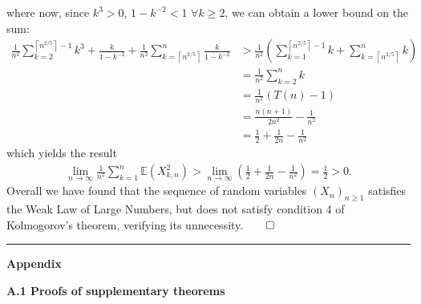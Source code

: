 \documentclass[10pt]{article}
\newcommand{\E}{\mathbb{E}}
\newcommand{\bp}[1]{\left({#1}\right)}
\newcommand{\1}[1]{\mathbbm{1}_{#1}}
\newcommand*{\ceil}[1]{\left\lceil#1\right\rceil}
\begin{document}
    where now, since $k^3>0$, $1-k^{-2}<1$ $\forall k\geq 2$, we can obtain a lower bound on the sum:
    \begin{align*}
        \frac{1}{n^2}\sum_{k=2}^{\ceil{n^{2/5}}-1}k^3+\frac{k}{1-k^{-2}}+\frac{1}{n^2}\sum_{k=\ceil{n^{2/5}}}^n\frac{k}{1-k^{-2}}
        &>\frac{1}{n^2}\bp{\sum_{k=1}^{\ceil{n^{2/5}}-1}k+\sum_{k=\ceil{n^{2/5}}}^nk}\\
        &=\frac{1}{n^2}\sum_{k=2}^nk\\
        &=\frac{1}{n^2}\bp{T(n)-1}\\
        &=\frac{n(n+1)}{2n^2}-\frac{1}{n^2}\\
        &=\frac{1}{2}+\frac{1}{2n}-\frac{1}{n^2}
    \end{align*}
    which yields the result
    \begin{align*}
        \lim_{n\rightarrow\infty}\frac{1}{n^2}\sum_{k=1}^n\E(X_{k,n}^2)>\lim_{n\rightarrow\infty}\bp{\frac{1}{2}+\frac{1}{2n}-\frac{1}{n^2}}=\frac{1}{2}>0.
    \end{align*}
    Overall we have found that the sequence of random variables $(X_n)_{n\geq 1}$ satisfies the Weak Law of Large Numbers, but does not satisfy condition 4 of Kolmogorov's theorem, verifying its unnecessity.\hfill{$\qed$}
    \\[5pt]
    \hrule
    \begin{center}
        {\bf\large Appendix}
    \end{center}
    {\bf A.1\hspace{5pt} Proofs of supplementary theorems}
    
\end{document}
